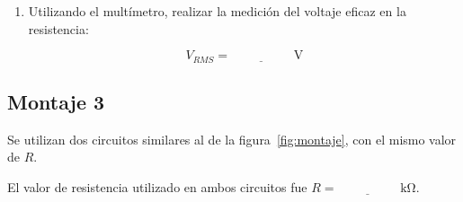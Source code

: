 \documentclass{article}
\newcommand{\vacio}[1][2cm]{\underline{\hspace{#1}}}
\begin{document}
\begin{enumerate}
        \item Utilizando el multímetro, realizar la medición del voltaje eficaz en la resistencia:

        \[
            V_{RMS} = \vacio\ \si{\volt}
        \]
    \end{enumerate}

    \subsection{Montaje 3}

    Se utilizan dos circuitos similares al de la figura~\ref{fig:montaje}, con el mismo valor de $R$.

    El valor de resistencia utilizado en ambos circuitos fue $R = \vacio\ \si{\kilo\ohm}$.
\end{document}
